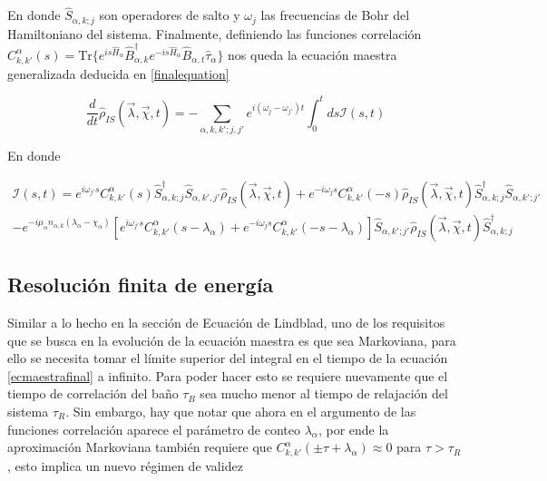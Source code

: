 En donde $\hat{S}_{\alpha,k;j}$ son operadores de salto y $\omega_{j}$ las frecuencias de Bohr del Hamiltoniano del sistema. Finalmente, definiendo las funciones correlación $C^{\alpha}_{k,k'}(s) = \text{Tr}\{e^{is\hat{H}_{\alpha} }\hat{B}^{\dagger}_{\alpha,k}e^{-is\hat{H}_{\alpha} }\hat{B}_{\alpha,t}\hat{\tau}_{\alpha}\}$ nos queda la ecuación maestra generalizada deducida en \ref{finalequation}

\begin{equation}
    \frac{d}{dt}\hat{\rho}_{IS}(\vec{\lambda},\vec{\chi},t) = - \sum_{\alpha,k,k';j,j'}e^{i(\omega_{j}-\omega_{j'})t}\int_{0}^{t}ds \mathcal{I}(s,t) 
\label{ecmaestrafinal}
\end{equation}

En donde

\begin{multline*}
    \mathcal{I}(s,t) = e^{i\omega_{j'}s} C^{\alpha}_{k,k'}(s)\hat{S}^{\dagger}_{\alpha,k;j}\hat{S}_{\alpha,k',j'}\hat{\rho}_{IS}(\vec{\lambda},\vec{\chi},t) + e^{-i\omega_{j}s}C^{\alpha}_{k,k'}(-s)\hat{\rho}_{IS}(\vec{\lambda},\vec{\chi},t)\hat{S}^{\dagger}_{\alpha,k;j}\hat{S}_{\alpha,k';j'} \\
    - e^{-i\mu_{\alpha}n_{\alpha,k}(\lambda_{\alpha} - \chi_{\alpha})}\left[e^{i\omega_{j'}s}C^{\alpha}_{k,k'}(s-\lambda_{\alpha}) + e^{-i\omega_{j}s}C^{\alpha}_{k,k'}(-s-\lambda_{\alpha})  \right]  \hat{S}_{\alpha,k';j'}\hat{\rho}_{IS}(\vec{\lambda},\vec{\chi},t)\hat{S}^{\dagger}_{\alpha,k;j}
\end{multline*}

\label{sec2:master}

\subsection{Resolución finita de energía}
Similar a lo hecho en la sección de Ecuación de Lindblad, uno de los requisitos que se busca en la evolución de la ecuación maestra es que sea Markoviana, para ello se necesita tomar el límite superior del integral en el tiempo de la ecuación \ref{ecmaestrafinal} a infinito. Para poder hacer esto se requiere nuevamente que el tiempo de correlación del baño $\tau_{B}$ sea mucho menor al tiempo de relajación del sistema $\tau_{R}$. Sin embargo, hay que notar que ahora en el argumento de las funciones correlación aparece el parámetro de conteo $\lambda_{\alpha}$, por ende la aproximación Markoviana también requiere que $C^{\alpha}_{k,k'}(\pm \tau + \lambda_\alpha) \approx 0$ para $\tau > \tau_{R}$, esto implica un nuevo régimen de validez

